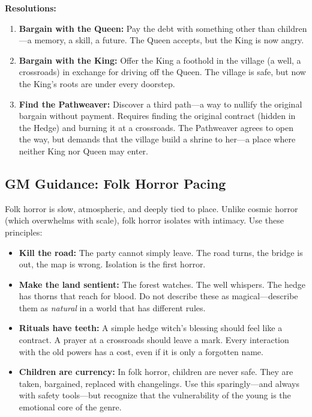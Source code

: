 \documentclass[11pt]{article}
\begin{document}
\textbf{Resolutions:}
\begin{enumerate}
\item \textbf{Bargain with the Queen:} Pay the debt with something other than children---a memory, a skill, a future. The Queen accepts, but the King is now angry.
\item \textbf{Bargain with the King:} Offer the King a foothold in the village (a well, a crossroads) in exchange for driving off the Queen. The village is safe, but now the King's roots are under every doorstep.
\item \textbf{Find the Pathweaver:} Discover a third path---a way to nullify the original bargain without payment. Requires finding the original contract (hidden in the Hedge) and burning it at a crossroads. The Pathweaver agrees to open the way, but demands that the village build a shrine to her---a place where neither King nor Queen may enter.
\end{enumerate}

\subsection{GM Guidance: Folk Horror Pacing}

Folk horror is slow, atmospheric, and deeply tied to place. Unlike cosmic horror (which overwhelms with scale), folk horror isolates with intimacy. Use these principles:

\begin{itemize}
\item \textbf{Kill the road:} The party cannot simply leave. The road turns, the bridge is out, the map is wrong. Isolation is the first horror.
\item \textbf{Make the land sentient:} The forest watches. The well whispers. The hedge has thorns that reach for blood. Do not describe these as magical---describe them as \textit{natural} in a world that has different rules.
\item \textbf{Rituals have teeth:} A simple hedge witch's blessing should feel like a contract. A prayer at a crossroads should leave a mark. Every interaction with the old powers has a cost, even if it is only a forgotten name.
\item \textbf{Children are currency:} In folk horror, children are never safe. They are taken, bargained, replaced with changelings. Use this sparingly---and always with safety tools---but recognize that the vulnerability of the young is the emotional core of the genre.
\end{itemize}
\end{document}
